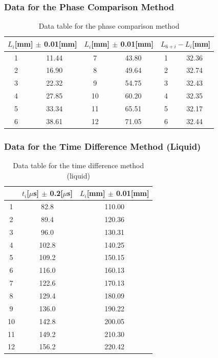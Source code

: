 \documentclass[12pt]{article}
\begin{document}
\subsubsection{Data for the Phase Comparison Method}
\begin{table}[H]
\centering
\begin{tabular}{|c|c|c|c|c|c|}
\hline
\multicolumn{2}{|c|}{$L_i$[mm] $\pm$ 0.01[mm]} & \multicolumn{2}{c|}{$L_i$[mm] $\pm$ 0.01[mm]} & \multicolumn{2}{c|}{$L_{6+i}-L_i$[mm]} \\ \hline
1          &11.44           & 7          &43.80          & 1          &32.36          \\ \hline
2          &16.90           & 8          &49.64          & 2          &32.74          \\ \hline
3          &22.32           & 9          &54.75          & 3          &32.43          \\ \hline
4          &27.85           & 10         &60.20          & 4          &32.35          \\ \hline
5          &33.34           & 11         &65.51          & 5          &32.17          \\ \hline
6          &38.61           & 12         &71.05          & 6          &32.44          \\ \hline
\end{tabular}
\caption{Data table for the phase comparison method}
\end{table}
\subsubsection{Data for the Time Difference Method (Liquid)}
\begin{table}[H]
\centering
\begin{tabular}{|c|c|c|}
\hline
   & $t_i$[$\mu$s] $\pm$ 0.2[$\mu$s] & $L_i$[mm] $\pm$ 0.01[mm]  \\ \hline
1  &82.8  &110.00  \\ \hline
2  &89.4  &120.36  \\ \hline
3  &96.0  &130.31  \\ \hline
4  &102.8  &140.25  \\ \hline
5  &109.2  &150.15  \\ \hline
6  &116.0  &160.13  \\ \hline
7  &122.6  &170.13  \\ \hline
8  &129.4  &180.09  \\ \hline
9  &136.0  &190.22  \\ \hline
10 &142.8  &200.05  \\ \hline
11 &149.2  &210.30  \\ \hline
12 &156.2  &220.42  \\ \hline
\end{tabular}
\caption{Data table for the time difference method (liquid)}
\end{table}
\end{document}

